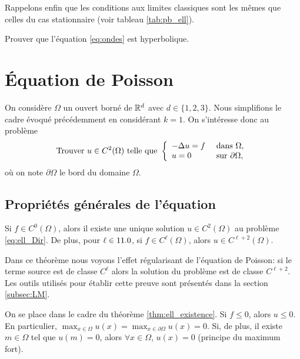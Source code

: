 \documentclass[12pt,a4paper,twoside]{article}
\begin{document}
Rappelons enfin que les conditions aux limites classiques sont 
les m\^emes que celles du cas stationnaire
(voir tableau \ref{tab:pb_ell}).

\begin{exercise}
  Prouver que l'\'equation \eqref{eq:ondes} est hyperbolique.
\end{exercise}

\section{\'Equation de Poisson}

On consid\`ere $\Omega$ un ouvert born\'e de $\mathbb{R}^d$ avec $d \in \{1,2,3\}$.
Nous simplifions le cadre \'evoqu\'e pr\'ec\'edemment
en consid\'erant $k=1$.
On s'int\'eresse donc au probl\`eme
\begin{equation}
  \label{eq:ell_Dir}
  \text{Trouver $u \in C^2(\Omega)$ telle que  }
  \left\{
    \begin{array}{l l}
      - \Delta u = f &\text{ dans } \Omega ,
      \\
      u = 0 &\text{ sur } \partial \Omega ,
    \end{array}
  \right.
\end{equation}
o\`u on note $\partial \Omega$ le bord du domaine $\Omega$.

\subsection{Propri\'et\'es g\'en\'erales de l'\'equation}
\label{subsec:Lap_prop}

\begin{theorem}
  \label{thm:ell_existence}
  Si $f \in C^0(\Omega)$, alors il existe une unique solution
  $u \in C^2(\Omega)$ au probl\`eme \eqref{eq:ell_Dir}.
  De plus, pour $\ell \in 11.0$, si $f \in C^{\ell}(\Omega)$, alors
  $u \in C^{\ell+2}(\Omega)$.
\end{theorem}

Dans ce th\'eor\`eme nous voyons l'effet r\'egularisant de l'\'equation de Poisson:
si le terme source est de classe $C^{\ell}$ alors la solution du probl\`eme
est de classe $C^{\ell + 2}$.
Les outils utilis\'es pour \'etablir cette preuve sont pr\'esent\'es
dans la section \ref{subsec:LM}.

\begin{proposition}
  On se place dans le cadre du th\'eor\`eme \ref{thm:ell_existence}.
  Si $f \leq 0$, alors $u \leq 0$. En particulier,
  $\max_{x\in \Omega} u(x) = \max_{x\in \partial \Omega} u(x) = 0$.
  Si, de plus, il existe $m\in \Omega$ tel que $u(m) = 0$,
  alors $\forall x \in \Omega$, $u(x) = 0$ 
  (principe du maximum fort).
\end{proposition}
\end{document}
